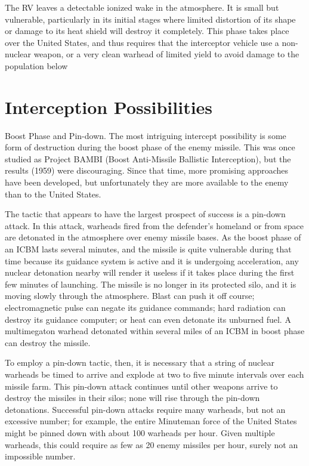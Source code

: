 The RV leaves a detectable ionized wake in the atmosphere. It is small but vulnerable, particularly in its initial stages where limited distortion of its shape or damage to its heat shield will destroy it completely. This phase takes place over the United States, and thus requires that the interceptor vehicle use a non-nuclear weapon, or a very clean warhead of limited yield to avoid damage to the population below

\section{Interception Possibilities}
Boost Phase and Pin-down. The most intriguing intercept possibility is some form of destruction during the boost phase of the enemy missile. This was once studied as Project BAMBI (Boost Anti-Missile Ballistic Interception), but the results (1959) were discouraging. Since that time, more promising approaches have been developed, but unfortunately they are more available to the enemy than to the United States.

The tactic that appears to have the largest prospect of success is a pin-down attack. In this attack, warheads fired from the defender's homeland or from space are detonated in the atmosphere over enemy missile bases. As the boost phase of an ICBM lasts several minutes, and the missile is quite vulnerable during that time because its guidance system is active and it is undergoing acceleration, any nuclear detonation nearby will render it useless if it takes place during the first few minutes of launching. The missile is no longer in its protected silo, and it is moving slowly through the atmosphere. Blast can push it off course; electromagnetic pulse can negate its guidance commands; hard radiation can destroy its guidance computer; or heat can even detonate its unburned fuel. A multimegaton warhead detonated within several miles of an ICBM in boost phase can destroy the missile.

To employ a pin-down tactic, then, it is necessary that a string of nuclear warheads be timed to arrive and explode at two to five minute intervals over each missile farm. This pin-down attack continues until other weapons arrive to destroy the missiles in their silos; none will rise through the pin-down detonations. Successful pin-down attacks require many warheads, but not an excessive number; for example, the entire Minuteman force of the United States might be pinned down with about 100 warheads per hour. Given multiple warheads, this could require as few as 20 enemy missiles per hour, surely not an impossible number.

